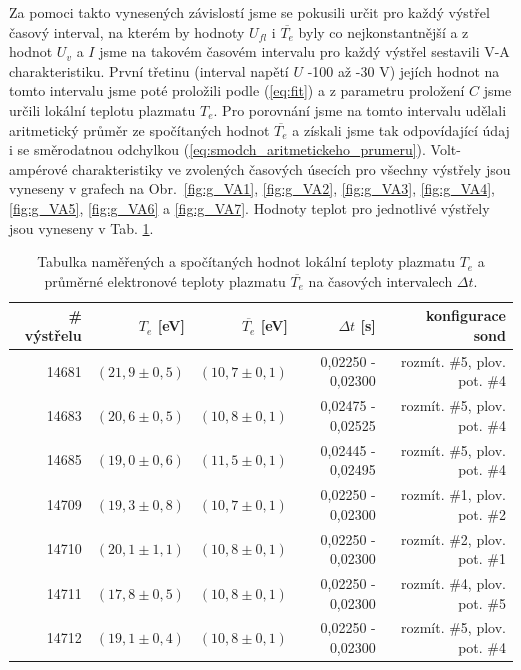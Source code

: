 \documentclass[english]{article}
\begin{document}
			Za pomoci takto vynesených závislostí jsme se pokusili určit pro každý výstřel časový interval, na kterém by hodnoty $U_{fl}$ i $\overline{T_e}$ byly co nejkonstantnější a z hodnot $U_v$ a $I$ jsme na takovém časovém intervalu pro každý výstřel sestavili V-A charakteristiku. První třetinu (interval napětí $U$ -100 až -30 V) jejích hodnot na tomto intervalu jsme poté proložili podle (\ref{eq:fit}) a z parametru proložení $C$ jsme určili lokální teplotu plazmatu $T_e$. Pro porovnání jsme na tomto intervalu udělali aritmetický průměr ze spočítaných hodnot $\overline{T_e}$ a získali jsme tak odpovídající údaj i se směrodatnou odchylkou (\ref{eq:smodch_aritmetickeho_prumeru}). Volt-ampérové charakteristiky ve zvolených časových úsecích pro všechny výstřely jsou vyneseny v grafech na Obr.~\ref{fig:g_VA1}, \ref{fig:g_VA2}, \ref{fig:g_VA3}, \ref{fig:g_VA4}, \ref{fig:g_VA5}, \ref{fig:g_VA6} a \ref{fig:g_VA7}. Hodnoty teplot pro jednotlivé výstřely jsou vyneseny v Tab. \ref{tab:teploty}. 
			
\begin{table}[htbp]
  \centering
    \begin{tabular}{|r|r|r|r|r|}
    \hline
    \# výstřelu & $T_e$ [eV] & $\overline{T_e}$ [eV] & $\Delta t$ [s] & konfigurace sond \bigstrut\\
    \hline
    14681 & $(21,9 \pm 0,5)$ & $( 10,7 \pm  0,1)$ & 0,02250 - 0,02300 & rozmít. \#5, plov. pot. \#4 \bigstrut\\
    \hline
    14683 & $(20,6 \pm 0,5)$ & $( 10,8 \pm  0,1)$ & 0,02475 - 0,02525 & rozmít. \#5, plov. pot. \#4 \bigstrut\\
    \hline
    14685 & $(19,0 \pm 0,6)$ & $( 11,5 \pm  0,1)$ & 0,02445 - 0,02495 & rozmít. \#5, plov. pot. \#4 \bigstrut\\
    \hline
    14709 & $(19,3 \pm 0,8)$ & $( 10,7 \pm  0,1)$ & 0,02250 - 0,02300 & rozmít. \#1, plov. pot. \#2 \bigstrut\\
    \hline
    14710 & $(20,1 \pm 1,1)$ & $( 10,8 \pm  0,1)$ & 0,02250 - 0,02300 & rozmít. \#2, plov. pot. \#1 \bigstrut\\
    \hline
    14711 & $(17,8 \pm 0,5)$ & $( 10,8 \pm  0,1)$ & 0,02250 - 0,02300 & rozmít. \#4, plov. pot. \#5 \bigstrut\\
    \hline
    14712 & $(19,1 \pm 0,4)$ & $( 10,8 \pm  0,1)$ & 0,02250 - 0,02300 & rozmít. \#5, plov. pot. \#4 \bigstrut\\
    \hline
    \end{tabular}%
      \caption{Tabulka naměřených a spočítaných hodnot lokální teploty plazmatu $T_e$ a průměrné elektronové teploty plazmatu $\overline{T_e}$ na časových intervalech $\Delta t$.  }
  \label{tab:teploty}%
\end{table}%
			
\end{document}
